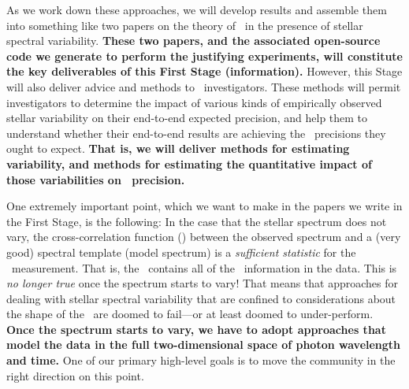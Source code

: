 \documentclass[12pt, letterpaper]{article}
\begin{document}
\noindent
As we work down these approaches, we will develop results and assemble them
into something like two papers on the theory of \EPRV\ in the presence of
stellar spectral variability. \textbf{These two papers, and the associated open-source
code we generate to perform the justifying experiments, will constitute the
key deliverables of this First Stage (information).}
However, this Stage will also deliver advice and methods to
\EPRV\ investigators.
These methods will permit investigators to determine the impact of
various kinds of empirically observed stellar variability on their
end-to-end expected precision,
and help them to understand whether their end-to-end results are
achieving the \RV\ precisions they ought to expect.
\textbf{That is, we will deliver methods for estimating variability, and methods
for estimating the quantitative impact of those variabilities on \RV\ precision.}

One extremely important point, which we want to make in the papers we write
in the First Stage, is the following:
In the case that the stellar spectrum does not vary, the
cross-correlation function (\CCF) between the observed spectrum and a
(very good) spectral template (model spectrum) is a \emph{sufficient
  statistic} for the \RV\ measurement.
That is, the \CCF\ contains all of the \RV\ information in the data.
This is \emph{no longer true} once the spectrum starts to vary!
That means that approaches for dealing with stellar spectral variability
that are confined to considerations about the shape of the \CCF\ are
doomed to fail---or at least doomed to under-perform.
\textbf{Once the spectrum starts to vary, we have to adopt approaches that model
the data in the full two-dimensional space of photon wavelength and time.}
One of our primary high-level goals is to move the community in the
right direction on this point.

\end{document}
